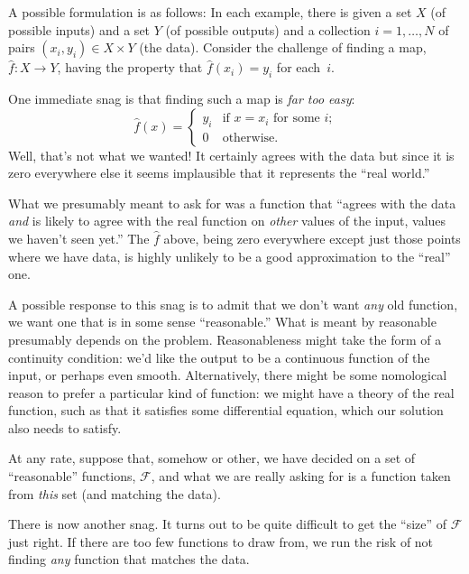 \documentclass[10pt, a4paper]{article}
\begin{document}
A possible formulation is as follows: In each example, there is given
a set $X$ (of possible inputs) and a set $Y$ (of possible outputs) and
a collection $i=1,\dots,N$ of pairs $(x_i, y_i)\in X\times Y$ (the
data). Consider the challenge of finding a map, $\hat{f}\colon X\to
Y$, having the property that $\hat{f}(x_i)= y_i$ for each~$i$.

One immediate snag is that finding such a map is \emph{far too easy}:
\begin{equation*}
  \hat{f}(x) =
  \begin{cases}
    y_i & \text{if $x = x_i$ for some $i$;} \\
      0 & \text{otherwise}.
  \end{cases}
\end{equation*}
Well, that's not what we wanted! It certainly agrees with the data but
since it is zero everywhere else it seems implausible that it
represents the “real world.”

What we presumably meant to ask for was a function that “agrees with
the data \emph{and} is likely to agree with the real function on
\emph{other} values of the input, values we haven't seen yet.” The
$\hat{f}$ above, being zero everywhere except just those points
where we have data, is highly unlikely to be a good approximation to
the “real” one.

A possible response to this snag is to admit that we don't want
\emph{any} old function, we want one that is in some sense
“reasonable.” What is meant by reasonable presumably depends on the
problem. Reasonableness might take the form of a continuity condition:
we'd like the output to be a continuous function of the input, or
perhaps even smooth. Alternatively, there might be some nomological
reason to prefer a particular kind of function: we might have a theory
of the real function, such as that it satisfies some differential
equation, which our solution also needs to satisfy.

At any rate, suppose that, somehow or other, we have decided on a set
of “reasonable” functions, $\mathcal{F}$, and what we are really asking for is a
function taken from \emph{this} set (and matching the data).

There is now another snag. It turns out to be quite difficult to get
the “size” of $\mathcal{F}$ just right. If there are too few functions to draw
from, we run the risk of not finding \emph{any} function that matches
the data.
\end{document}
